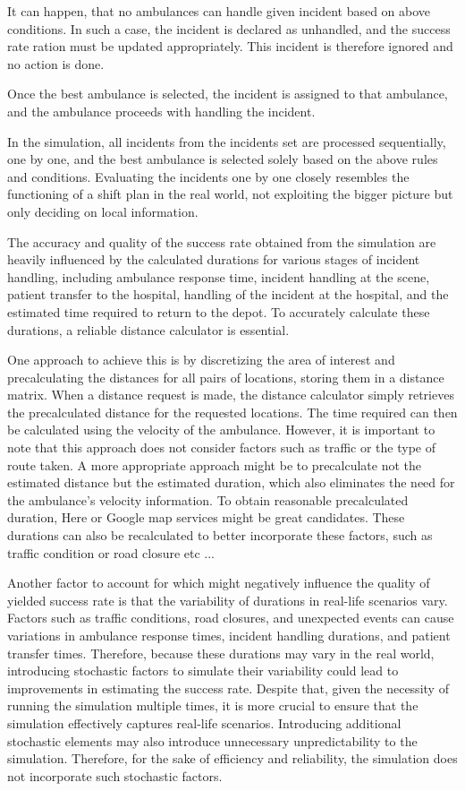 It can happen, that no ambulances can handle given incident based on above
conditions. In such a case, the incident is declared as unhandled, and the
success rate ration must be updated appropriately. This incident is therefore
ignored and no action is done.

Once the best ambulance is selected, the incident is assigned to that
ambulance, and the ambulance proceeds with handling the incident.

In the simulation, all incidents from the incidents set are processed
sequentially, one by one, and the best ambulance is selected solely based on
the above rules and conditions. Evaluating the incidents one by one closely
resembles the functioning of a shift plan in the real world, not exploiting the
bigger picture but only deciding on local information.

The accuracy and quality of the success rate obtained from the simulation are
heavily influenced by the calculated durations for various stages of incident
handling, including ambulance response time, incident handling at the scene,
patient transfer to the hospital, handling of the incident at the hospital, and
the estimated time required to return to the depot. To accurately calculate
these durations, a reliable distance calculator is essential.

One approach to achieve this is by discretizing the area of interest and
precalculating the distances for all pairs of locations, storing them in a
distance matrix. When a distance request is made, the distance calculator
simply retrieves the precalculated distance for the requested locations. The
time required can then be calculated using the velocity of the ambulance.
However, it is important to note that this approach does not consider factors
such as traffic or the type of route taken. A more appropriate approach might
be to precalculate not the estimated distance but the estimated duration, which
also eliminates the need for the ambulance's velocity information. To obtain
reasonable precalculated duration, Here or Google map services might be great
candidates. These durations can also be recalculated to better incorporate
these factors, such as traffic condition or road closure etc ...

Another factor to account for which might negatively influence the quality of
yielded success rate is that the variability of durations in real-life
scenarios vary. Factors such as traffic conditions, road closures, and
unexpected events can cause variations in ambulance response times, incident
handling durations, and patient transfer times. Therefore, because these
durations may vary in the real world, introducing stochastic factors to
simulate their variability could lead to improvements in estimating the success
rate. Despite that, given the necessity of running the simulation multiple
times, it is more crucial to ensure that the simulation effectively captures
real-life scenarios. Introducing additional stochastic elements may also
introduce unnecessary unpredictability to the simulation. Therefore, for the
sake of efficiency and reliability, the simulation does not incorporate such
stochastic factors.